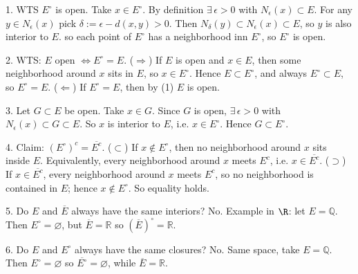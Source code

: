 \documentclass{report}
\begin{document}

\begin{proofWithHibiscus}
  1. WTS $E^\circ$ is open. Take $x\in E^\circ$. By definition $\exists\,\epsilon>0$ with $N_\epsilon(x)\subset E$. 
     For any $y\in N_\epsilon(x)$ pick $\delta:=\epsilon - d(x,y)>0$. Then $N_\delta(y)\subset N_\epsilon(x)\subset E$,
     so $y$ is also interior to $E$. so each point of $E^\circ$ has a neighborhood inn $E^\circ$, so $E^\circ$ is open.
  
  2. WTS: $E$ open $\Leftrightarrow E^\circ=E$.  
     ($\Rightarrow$) If $E$ is open and $x\in E$, then some neighborhood around $x$ sits in $E$, so $x\in E^\circ$. Hence $E\subset E^\circ$,
     and always $E^\circ\subset E$, so $E^\circ=E$.  
     ($\Leftarrow$) If $E^\circ=E$, then by (1) $E$ is open.
  
  3. Let $G\subset E$ be open. Take $x\in G$. Since $G$ is open, $\exists\,\epsilon>0$ with $N_\epsilon(x)\subset G\subset E$.
     So $x$ is interior to $E$, i.e. $x\in E^\circ$. Hence $G\subset E^\circ$.
  
  4. Claim: $(E^\circ)^c=\overline{E^c}$.  
     ($\subset$) If $x\notin E^\circ$, then no neighborhood around $x$ sits inside $E$. Equivalently, every neighborhood around $x$ meets $E^c$,
     i.e. $x\in\overline{E^c}$.  
     ($\supset$) If $x\in\overline{E^c}$, every neighborhood around $x$ meets $E^c$, so no neighborhood is contained in $E$; hence $x\notin E^\circ$.
     So equality holds.
  
  5. Do $E$ and $\overline{E}$ always have the same interiors? No. Example in $\R$:
     let $E=\mathbb{Q}$. Then $E^\circ=\varnothing$, but $\overline{E}=\mathbb{R}$ so $(\overline{E})^\circ=\mathbb{R}$.
  
  6. Do $E$ and $E^\circ$ always have the same closures? No. Same space, take $E=\mathbb{Q}$.
     Then $E^\circ=\varnothing$ so $\overline{E^\circ}=\varnothing$, while $\overline{E}=\mathbb{R}$.
  \end{proofWithHibiscus}
  
\end{document}
